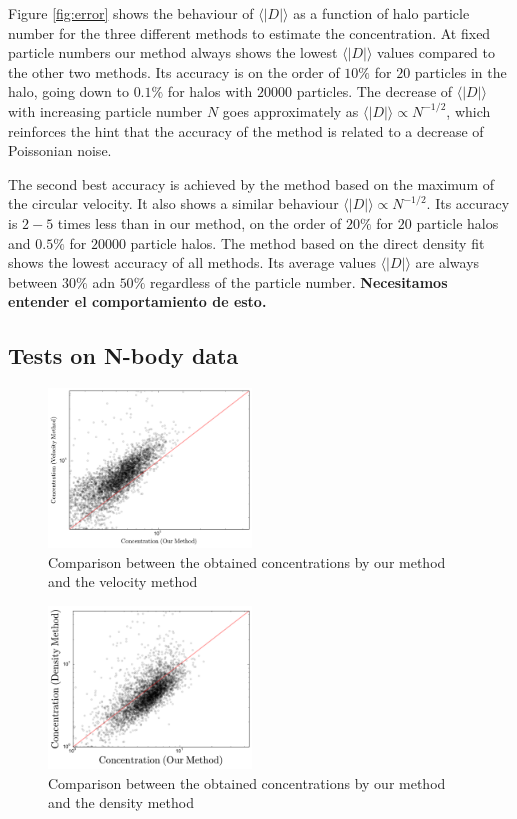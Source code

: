 \documentclass[useAMS,usenatbib]{mn2e}
\newcommand{\avg}[1]{\langle{#1}\rangle}
\begin{document}
Figure \ref{fig:error} shows the behaviour of $\avg{|D|}$ as a function of
halo particle number for the three different methods to estimate the
concentration.
At fixed particle numbers our method always shows the lowest
$\avg{|D|}$ values compared to the other two methods.
Its accuracy is on the order of $10\%$ for $20$ particles in the halo,
going down to $0.1\%$ for halos with $20000$ particles.
The decrease of $\avg{|D|}$ with increasing particle number $N$ goes
approximately as $\avg{|D|}\propto N^{-1/2}$, which reinforces the hint that
the accuracy of the method is related to a decrease of Poissonian
noise.

The second best accuracy is achieved by the method based on the
maximum of the circular velocity.
It also shows a similar behaviour $\avg{|D|}\propto N^{-1/2}$.
Its accuracy is $2-5$ times less than in our method, on the order of
$20\%$ for $20$ particle halos and $0.5\%$ for $20000$ particle halos.
The method based on the direct density fit shows the lowest accuracy
of all methods.
Its average values $\avg{|D|}$ are always between $30\%$ adn $50\%$
regardless of the particle number. {\bf Necesitamos entender el
  comportamiento de esto.}

\subsection{Tests on N-body data}
\label{sec:data}
\begin{figure}
  \begin{center}
    \includegraphics[width=0.48\textwidth]{mass-velocity.pdf}
  \end{center}
  \caption{Comparison between the obtained concentrations by our method and the velocity method
  \label{fig:mdv}}
\end{figure}

\begin{figure}
  \begin{center}
    \includegraphics[width=0.48\textwidth]{mass-density.pdf}
  \end{center}
  \caption{Comparison between the obtained concentrations by our method and the density method
  \label{fig:mdv}}
\end{figure}
\end{document}
